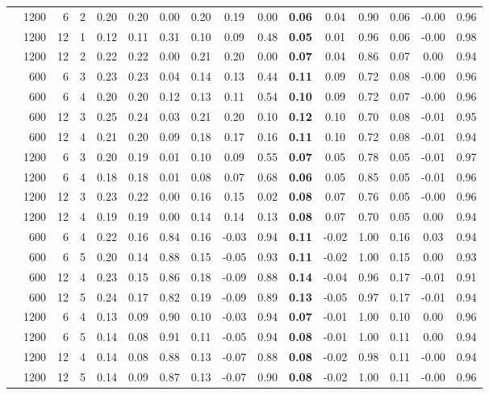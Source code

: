 \begin{tabular}{||c|rrr||ccc|ccc|ccc|ccc||}
   & 1200 & 6 & 2 & 0.20 & 0.20 & 0.00 & 0.20 & 0.19 & 0.00 & \bf 0.06 & 0.04 & 0.90 & 0.06 & -0.00 & 0.96 \\ 
   & 1200 & 12 & 1 & 0.12 & 0.11 & 0.31 & 0.10 & 0.09 & 0.48 & \bf 0.05 & 0.01 & 0.96 & 0.06 & -0.00 & 0.98 \\ 
   & 1200 & 12 & 2 & 0.22 & 0.22 & 0.00 & 0.21 & 0.20 & 0.00 & \bf 0.07 & 0.04 & 0.86 & 0.07 & 0.00 & 0.94 \\ 
   \hline
   \parbox[t]{2.8mm}{}
 & 600 & 6 & 3 & 0.23 & 0.23 & 0.04 & 0.14 & 0.13 & 0.44 & \bf 0.11 & 0.09 & 0.72 & 0.08 & -0.00 & 0.96 \\ 
   & 600 & 6 & 4 & 0.20 & 0.20 & 0.12 & 0.13 & 0.11 & 0.54 & \bf 0.10 & 0.09 & 0.72 & 0.07 & -0.00 & 0.96 \\ 
   & 600 & 12 & 3 & 0.25 & 0.24 & 0.03 & 0.21 & 0.20 & 0.10 & \bf 0.12 & 0.10 & 0.70 & 0.08 & -0.01 & 0.95 \\ 
   & 600 & 12 & 4 & 0.21 & 0.20 & 0.09 & 0.18 & 0.17 & 0.16 & \bf 0.11 & 0.10 & 0.72 & 0.08 & -0.01 & 0.94 \\ 
   & 1200 & 6 & 3 & 0.20 & 0.19 & 0.01 & 0.10 & 0.09 & 0.55 & \bf 0.07 & 0.05 & 0.78 & 0.05 & -0.01 & 0.97 \\ 
   & 1200 & 6 & 4 & 0.18 & 0.18 & 0.01 & 0.08 & 0.07 & 0.68 & \bf 0.06 & 0.05 & 0.85 & 0.05 & -0.01 & 0.96 \\ 
   & 1200 & 12 & 3 & 0.23 & 0.22 & 0.00 & 0.16 & 0.15 & 0.02 & \bf 0.08 & 0.07 & 0.76 & 0.05 & -0.00 & 0.96 \\ 
   & 1200 & 12 & 4 & 0.19 & 0.19 & 0.00 & 0.14 & 0.14 & 0.13 & \bf 0.08 & 0.07 & 0.70 & 0.05 & 0.00 & 0.94 \\ 
   \hline
   \parbox[t]{2.8mm}{}
 & 600 & 6 & 4 & 0.22 & 0.16 & 0.84 & 0.16 & -0.03 & 0.94 & \bf 0.11 & -0.02 & 1.00 & 0.16 & 0.03 & 0.94 \\ 
   & 600 & 6 & 5 & 0.20 & 0.14 & 0.88 & 0.15 & -0.05 & 0.93 & \bf 0.11 & -0.02 & 1.00 & 0.15 & 0.00 & 0.93 \\ 
   & 600 & 12 & 4 & 0.23 & 0.15 & 0.86 & 0.18 & -0.09 & 0.88 & \bf 0.14 & -0.04 & 0.96 & 0.17 & -0.01 & 0.91 \\ 
   & 600 & 12 & 5 & 0.24 & 0.17 & 0.82 & 0.19 & -0.09 & 0.89 & \bf 0.13 & -0.05 & 0.97 & 0.17 & -0.01 & 0.94 \\ 
   & 1200 & 6 & 4 & 0.13 & 0.09 & 0.90 & 0.10 & -0.03 & 0.94 & \bf 0.07 & -0.01 & 1.00 & 0.10 & 0.00 & 0.96 \\ 
   & 1200 & 6 & 5 & 0.14 & 0.08 & 0.91 & 0.11 & -0.05 & 0.94 & \bf 0.08 & -0.01 & 1.00 & 0.11 & 0.00 & 0.94 \\ 
   & 1200 & 12 & 4 & 0.14 & 0.08 & 0.88 & 0.13 & -0.07 & 0.88 & \bf 0.08 & -0.02 & 0.98 & 0.11 & -0.00 & 0.94 \\ 
   & 1200 & 12 & 5 & 0.14 & 0.09 & 0.87 & 0.13 & -0.07 & 0.90 & \bf 0.08 & -0.02 & 1.00 & 0.11 & -0.00 & 0.96 \\ 
   \hline
\hline
\end{tabular}
